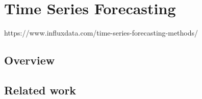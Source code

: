 \chapter{Time Series Forecasting}
\label{chap:time-series-forecasting}
https://www.influxdata.com/time-series-forecasting-methods/



\section{Overview}
\label{sec:overview}

\section{Related work}
\label{sec:related-work}
